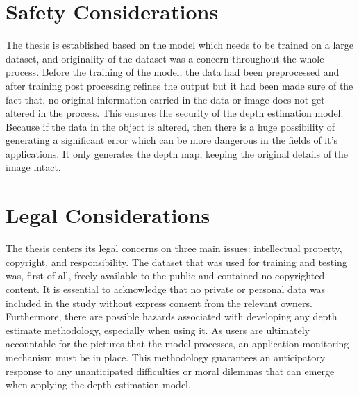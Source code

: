 \documentclass[a4paper,12pt,oneside]{book}
\begin{document}
\section{Safety Considerations}
The thesis is established based on the model which needs to be trained on a large dataset, and originality of the dataset was a concern throughout the whole process.  Before the training of the model, the data had been preprocessed and  after training post processing refines the output but it had been made sure of the fact that, no original information carried in the data or image does not get altered in the process. This ensures the security of the depth estimation model. Because if the data in the object is altered, then there is a huge possibility of generating a significant error which can be more dangerous in the fields of it's applications. It only generates the depth map, keeping the original details of the image intact.
\section{Legal Considerations}
The thesis centers its legal concerns on three main issues: intellectual property, copyright, and responsibility. The dataset that was used for training and testing was, first of all, freely available to the public and contained no copyrighted content. It is essential to acknowledge that no private or personal data was included in the study without express consent from the relevant owners.
Furthermore, there are possible hazards associated with developing any depth estimate methodology, especially when using it. As users are ultimately accountable for the pictures that the model processes, an application monitoring mechanism must be in place. This methodology guarantees an anticipatory response to any unanticipated difficulties or moral dilemmas that can emerge when applying the depth estimation model.
\end{document}
